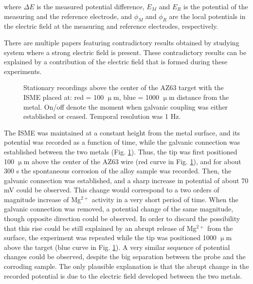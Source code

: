 where $\Delta E$ is the measured potential difference, $E_M$ and $E_R$ is the potential of the measuring and the reference electrode, and $\phi_M$ and $\phi_R$ are the local potentials in the electric field at the measuring and reference electrodes, respectively.

There are multiple papers featuring contradictory results obtained by studying system where a strong electric field is present. These contradictory results can be explained by a contribution of the electric field that is formed during these experiments. 

\begin{figure}
\centering
{}
\caption{Stationary recordings above the center of the AZ63 target with the ISME placed at: red = 100 $\upmu$m, blue = 1000 $\upmu$m distance from the metal. On/off denote the moment when galvanic coupling was either established or ceased. Temporal resolution was 1 Hz.}
\label{fig:approach}
\end{figure}

The ISME was maintained at a constant height from the metal surface, and its potential was recorded as a function of time, while the galvanic connection was established between the two metals (Fig. \ref{fig:approach}).
Thus, the tip was first positioned 100 $\upmu$m above the center of the AZ63 wire (red curve in Fig. \ref{fig:approach}), and for about 300 s the spontaneous corrosion of the alloy sample was recorded.
Then, the galvanic connection was established, and a sharp increase in potential of about 70 mV could be observed.
This change would correspond to a two orders of magnitude increase of Mg$^{2+}$ activity in a very short period of time.
When the galvanic connection was removed, a potential change of the same magnitude, though opposite direction could be observed.
In order to discard the possibility that this rise could be still explained by an abrupt release of Mg$^{2+}$ from the surface, the experiment was repeated while the tip was positioned 1000 $\upmu$m above the target (blue curve in Fig. \ref{fig:approach}).
A very similar sequence of potential changes could be observed, despite the big separation between the probe and the corroding sample.
The only plausible explanation is that the abrupt change in the recorded potential is due to the electric field developed between the two metals. 

